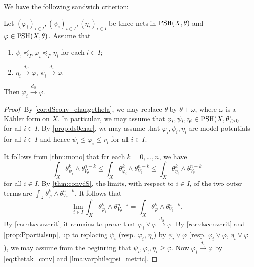 We have the following sandwich criterion:
\begin{corollary}\label{cor:dsconvupplower}
    Let $(\varphi_i)_{i\in I}, (\psi_i)_{i\in I}, (\eta_i)_{i\in I}$ be three nets in $\mathrm{PSH}(X,\theta)$ and $\varphi\in \mathrm{PSH}(X,\theta)$. Assume that
    \begin{enumerate}
        \item\label{itm:cor:dsconvupplower:1} $\psi_i\preceq_P \varphi_i\preceq_P \eta_i$ for each $i\in I$;
        \item\label{itm:cor:dsconvupplower:2} $\eta_i\xrightarrow{d_S} \varphi$, $\psi_i\xrightarrow{d_S} \varphi$.
    \end{enumerate}
    Then $\varphi_i\xrightarrow{d_S}\varphi$.
\end{corollary}
\begin{proof}
    By \cref{cor:dSconv_changetheta}, we may replace $\theta$ by $\theta+\omega$, where $\omega$ is a Kähler form on $X$. In particular, we may assume that $\varphi_i,\psi_i,\eta_i\in \mathrm{PSH}(X,\theta)_{>0}$ for all $i\in I$.
    By \cref{prop:ds0char}, we may assume that $\varphi_i,\psi_i,\eta_i$ are model potentials for all $i\in I$ and hence $\psi_i \leq \varphi_i\leq \eta_i$ for all $i\in I$.

    It follows from \cref{thm:mono} that for each $k=0,\ldots,n$, we have
    \[
    \int_X \theta_{\psi_i}^k\wedge \theta_{V_{\theta}}^{n-k}\leq \int_X \theta_{\varphi_i}^k\wedge \theta_{V_{\theta}}^{n-k}\leq \int_X \theta_{\eta_i}^k\wedge \theta_{V_{\theta}}^{n-k}
    \]
    for all $i\in I$. By \cref{thm:convdS}, the limits, with respect to $i\in I$, of the two outer terms are $\int_X \theta_{\varphi}^k\wedge \theta_{V_{\theta}}^{n-k}$. It follows that
    \begin{equation}\label{eq:thetak_conv}
    \lim_{i\in I}\int_X \theta_{\varphi_i}^k\wedge \theta_{V_{\theta}}^{n-k}=\int_X \theta_{\varphi}^k\wedge \theta_{V_{\theta}}^{n-k}.
    \end{equation}
    By \cref{cor:dsconvcrit}, it remains to prove that $\varphi_i \lor \varphi \xrightarrow{d_S}\varphi$. By \cref{cor:dsconvcrit} and \cref{prop:Ppartialsup}, up to replacing $\psi_i$ (resp. $\varphi_i$, $\eta_i$) by $\psi_i\lor \varphi$ (resp. $\varphi_i\lor\varphi$, $\eta_i\lor\varphi$), we may assume from the beginning that $\psi_i,\varphi_i,\eta_i\geq \varphi$. Now $\varphi_i\xrightarrow{d_S}\varphi$ by \eqref{eq:thetak_conv} and \cref{lma:varphileqpsi_metric}.
\end{proof}

